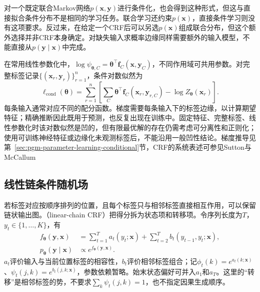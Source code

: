 对一个既定联合Markov网络$p(\bm{x},\bm{y})$进行条件化，也会得到这种形式，但这与直接拟合条件分布不是相同的学习任务。联合学习还约束$p(\bm{x})$，直接条件学习则没有这项要求。反过来，在给定一个CRF后可以另选$p(\bm{x})$组成联合分布，但这个额外选择并非CRF本身确定。对缺失输入求概率边缘同样需要额外的输入模型，不能直接从$p(\bm{y}\mid\bm{x})$中完成。

在常用线性参数化中，$\log\psi_{\bm{\theta},C}=\bm{\theta}^\top\bm{f}_C(\bm{x},\bm{y}_C)$，不同作用域可共用参数。对完整标签记录$\{(\bm{x}_r,\bm{y}_r)\}_{r=1}^n$，条件对数似然为
\begin{equation}
  \ell_{\mathrm{cond}}(\bm{\theta})
    =\sum_{r=1}^n
       \left[
        \sum_C\bm{\theta}^\top
                    \bm{f}_C(\bm{x}_r,\bm{y}_{r,C})
        -\log Z_{\bm{\theta}}(\bm{x}_r)
       \right].
  \label{eq:pgm-energy-models-crf-likelihood}
\end{equation}
每条输入通常对应不同的配分函数。梯度需要每条输入下的标签边缘，以计算期望特征；精确推断因此既用于预测，也反复出现在训练中。固定特征、完整标签、线性参数化时该对数似然是凹的，但有限最优解的存在仍需考虑可分离性和正则化；使用可训练神经特征或边缘化未观测标签后，不能沿用一般凹性结论。梯度推导见第~\ref{sec:pgm-parameter-learning-conditional}节，CRF的系统表述可参见Sutton与McCallum

\subsection{线性链条件随机场}
\label{sec:pgm-energy-models-linear-chain}

若标签对应按顺序排列的位置，且每个标签只与相邻标签直接相互作用，可以保留链状输出图。（linear-chain CRF）把得分拆为状态项和转移项。令序列长度为$T$，$y_t\in\{1,\ldots,K\}$，有
\begin{equation}
  \begin{aligned}
    f_{\bm{\theta}}(\bm{y},\bm{x})
      &=\sum_{t=1}^T a_t(y_t;\bm{x})
        +\sum_{t=2}^T b_t(y_{t-1},y_t;\bm{x}),\\
    p_{\bm{\theta}}(\bm{y}\mid\bm{x})
      &\propto e^{f_{\bm{\theta}}(\bm{y},\bm{x})}.
  \end{aligned}
  \label{eq:pgm-energy-models-chain-score}
\end{equation}
$a_t$评价输入与当前位置标签的相容性，$b_t$评价相邻标签组合；记$\phi_t(k)=e^{a_t(k;\bm{x})}$、$\psi_t(j,k)=e^{b_t(j,k;\bm{x})}$，参数依赖暂略。始末状态偏好可并入$a_1$和$a_T$。这里的“转移”是相邻标签的势，不要求$\sum_k\psi_t(j,k)=1$，也不指定因果生成顺序。

